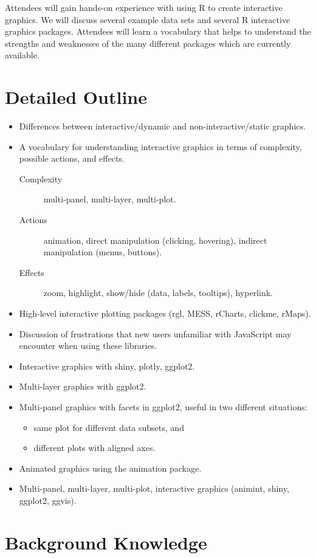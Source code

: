 \documentclass[11pt]{article}
\begin{document}
Attendees will gain hands-on experience with using R to create
interactive graphics. We will discuss several example data sets and
several R interactive graphics packages. Attendees will learn a
vocabulary that helps to understand the strengths and weaknesses of
the many different packages which are currently available.

\section*{Detailed Outline}
\label{sec:orgheadline10}
\begin{itemize}
\item Differences between interactive/dynamic and non-interactive/static graphics.
\item A vocabulary for understanding interactive graphics in terms of
  complexity, possible actions, and effects.
\begin{description}
\item[Complexity] multi-panel, multi-layer, multi-plot.
\item[Actions] animation, direct manipulation (clicking, hovering), indirect manipulation
  (menus, buttons).
\item[Effects] zoom, highlight, show/hide (data, labels, tooltips),
  hyperlink.
\end{description}
\item High-level interactive plotting packages (rgl, MESS, rCharts,
  clickme, rMaps).
\item Discussion of frustrations that
new users unfamiliar with JavaScript may encounter when using these
libraries.
\item Interactive graphics with shiny, plotly, ggplot2.
\item Multi-layer graphics with ggplot2.
\item Multi-panel graphics with facets in ggplot2, useful in two
  different situations:
\begin{itemize}
\item same plot for different data subsets, and
\item different plots with aligned axes.
\end{itemize}
\item Animated graphics using the animation package.
\item Multi-panel, multi-layer, multi-plot, interactive graphics
  (animint, shiny, ggplot2, ggvis).
\end{itemize}

\section*{Background Knowledge}
\end{document}
